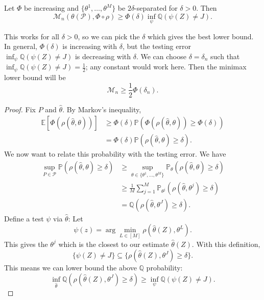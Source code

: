 \begin{prop}
    Let $\Phi$ be increasing and $\{\theta^1, \ldots, \theta^M\}$ be $2\delta$-separated for $\delta > 0$. Then
    \begin{equation*}
        \mathcal{M}_n(\theta(\mathcal{P}), \Phi \circ \rho) \geq \Phi(\delta) \inf_{\psi} \mathbb{Q}(\psi(Z) \neq J).
    \end{equation*}
\end{prop}

This works for all $\delta > 0$, so we can pick the $\delta$ which gives the best lower bound. In general, $\Phi(\delta)$ is increasing with $\delta$, but the testing error $\inf_\psi \mathbb{Q}(\psi(Z) \neq J)$ is decreasing with $\delta$. We can choose $\delta = \delta_n$ such that $\inf_\psi \mathbb{Q}(\psi(Z) \neq J) = \frac{1}{2}$; any constant would work here. Then the minimax lower bound will be
\begin{equation*}
    \mathcal{M}_n \geq \frac{1}{2} \Phi(\delta_n).
\end{equation*}

\begin{proof}
    Fix $P$ and $\widehat{\theta}$. By Markov's inequality,
    \begin{align*}
        \mathbb{E}[\Phi(\rho(\widehat{\theta}, \theta))] &\geq \Phi(\delta) \mathbb{P}(\Phi(\rho(\widehat{\theta}, \theta)) \geq \Phi(\delta)) \\
        &= \Phi(\delta) \mathbb{P}(\rho(\widehat{\theta}, \theta) \geq \delta).
    \end{align*}
    We now want to relate this probability with the testing error. We have
    \begin{align*}
        \sup_{P \in \mathcal{P}} \mathbb{P}(\rho(\widehat{\theta}, \theta) \geq \delta)
        &\geq \sup_{\theta \in \{\theta^1, \ldots, \theta^M\}} \mathbb{P}_\theta(\rho(\widehat{\theta}, \theta) \geq \delta) \\
        &\geq \frac{1}{M} \sum_{j=1}^{M} \mathbb{P}_{\theta^j}(\rho(\widehat{\theta}, \theta^j) \geq \delta) \\
        &= \mathbb{Q}(\rho(\widehat{\theta}, \theta^J) \geq \delta).
    \end{align*}
    Define a test $\psi$ via $\widehat{\theta}$: Let
    \begin{equation*}
        \psi(z) = \arg\min_{L \in [M]} \rho(\widehat{\theta}(Z), \theta^L).
    \end{equation*}
    This gives the $\theta^j$ which is the closest to our estimate $\widehat{\theta}(Z)$. With this definition,
    \begin{equation*}
        \{\psi(Z) \neq J\} \subseteq \{\rho(\widehat{\theta}(Z), \theta^J) \geq \delta\}.
    \end{equation*}
    This means we can lower bound the above $\mathbb{Q}$ probability:
    \begin{equation*}
        \inf_{\widehat{\theta}} \mathbb{Q}(\rho(\widehat{\theta}(Z), \theta^J) \geq \delta) \geq \inf_{\psi} \mathbb{Q}(\psi(Z) \neq J).
    \end{equation*}
\end{proof}

